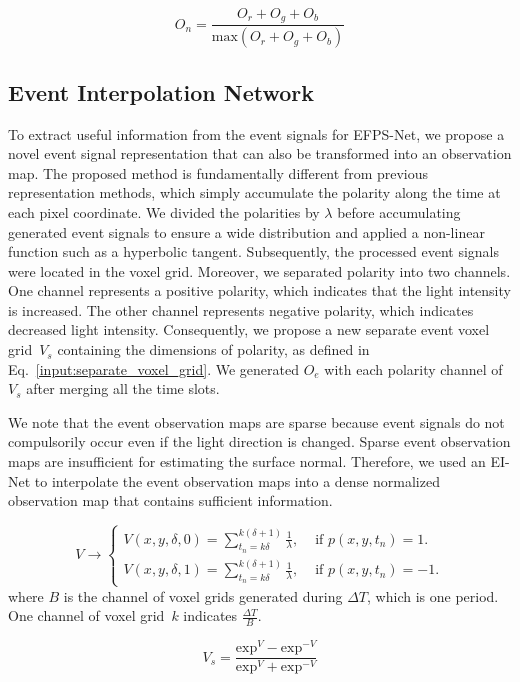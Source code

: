 \documentclass[preprint,12pt,authoryear]{elsarticle}
\begin{document}
\begin{equation}
O_{n} = \frac{O_{r} + O_{g} + O_{b}}{\text{max}(O_{r} + O_{g} + O_{b})}
\label{input:normalize}
\end{equation}

\subsection{Event Interpolation Network}
To extract useful information from the event signals for EFPS-Net, we propose a novel event signal representation that can also be transformed into an observation map.
The proposed method is fundamentally different from previous representation methods, which simply accumulate the polarity along the time at each pixel coordinate.
We divided the polarities by $\lambda$ before accumulating generated event signals to ensure a wide distribution and applied a non-linear function such as a hyperbolic tangent.
Subsequently, the processed event signals were located in the voxel grid.
Moreover, we separated polarity into two channels.
One channel represents a positive polarity, which indicates that the light intensity is increased. 
The other channel represents negative polarity, which indicates decreased light intensity.
Consequently, we propose a new separate event voxel grid~$V_{s}$ containing the dimensions of polarity, as defined in Eq.~{\ref{input:separate_voxel_grid}}.
We generated $O_{e}$ with each polarity channel of $V_{s}$ after merging all the time slots.

We note that the event observation maps are sparse because event signals do not compulsorily occur even if the light direction is changed.
Sparse event observation maps are insufficient for estimating the surface normal.
Therefore, we used an EI-Net to interpolate the event observation maps into a dense normalized observation map that contains sufficient information.

$$
V\rightarrow \begin{cases}
V(x,y,\delta,0) = \sum^{k(\delta+1)}_{t_{n}=k\delta}{\frac{1}{\lambda}}, & \text{ if } p(x,y,t_{n})=1. \\
V(x,y,\delta,1) = \sum^{k(\delta+1)}_{t_{n}=k\delta}{\frac{1}{\lambda}}, & \text{ if } p(x,y,t_{n})=-1.
\end{cases}
$$
where $B$ is the channel of voxel grids generated during $\Delta T$, which is one period. One channel of voxel grid~$k$ indicates $\frac{\Delta T}{B}$.


\begin{equation}
V_{s} = \frac{\text{exp}^{V}-\text{exp}^{-V}}{\text{exp}^{V}+\text{exp}^{-V}}
\label{input:separate_voxel_grid}
\end{equation}
\end{document}
